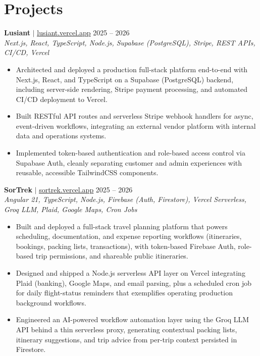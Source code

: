 \documentclass[letterpaper,10.5pt]{article}
\begin{document}
\section{Projects}

\textbf{Lusiant} $|$ \href{https://lusiant.vercel.app}{\underline{lusiant.vercel.app}} \hfill 2025 -- 2026 \\
\textit{Next.js, React, TypeScript, Node.js, Supabase (PostgreSQL), Stripe, REST APIs, CI/CD, Vercel}
\begin{itemize}[leftmargin=0.2in, itemsep=0pt, topsep=3pt]
  \small
  \item Architected and deployed a production full-stack platform end-to-end with Next.js, React, and TypeScript on a Supabase (PostgreSQL) backend, including server-side rendering, Stripe payment processing, and automated CI/CD deployment to Vercel.
  \item Built RESTful API routes and serverless Stripe webhook handlers for async, event-driven workflows, integrating an external vendor platform with internal data and operations systems.
  \item Implemented token-based authentication and role-based access control via Supabase Auth, cleanly separating customer and admin experiences with reusable, accessible TailwindCSS components.
\end{itemize}

\vspace{4pt}

\textbf{SorTrek} $|$ \href{https://sortrek.vercel.app}{\underline{sortrek.vercel.app}} \hfill 2025 -- 2026 \\
\textit{Angular 21, TypeScript, Node.js, Firebase (Auth, Firestore), Vercel Serverless, Groq LLM, Plaid, Google Maps, Cron Jobs}
\begin{itemize}[leftmargin=0.2in, itemsep=0pt, topsep=3pt]
  \small
  \item Built and deployed a full-stack travel planning platform that powers scheduling, documentation, and expense reporting workflows (itineraries, bookings, packing lists, transactions), with token-based Firebase Auth, role-based trip permissions, and shareable public itineraries.
  \item Designed and shipped a Node.js serverless API layer on Vercel integrating Plaid (banking), Google Maps, and email parsing, plus a scheduled cron job for daily flight-status reminders that exemplifies operating production background workflows.
  \item Engineered an AI-powered workflow automation layer using the Groq LLM API behind a thin serverless proxy, generating contextual packing lists, itinerary suggestions, and trip advice from per-trip context persisted in Firestore.
\end{itemize}
\end{document}
